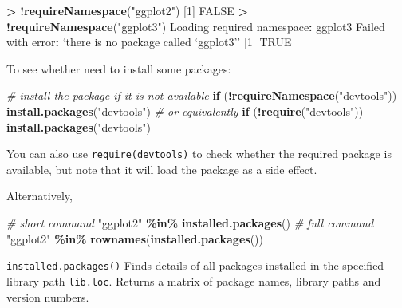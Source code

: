 \documentclass[
  a4paper,
  twoside,
  openright]{book}
\newenvironment{Shaded}{\begin{snugshade}}{\end{snugshade}}
\newcommand{\CommentTok}[1]{\textcolor[rgb]{0.56,0.35,0.01}{\textit{#1}}}
\newcommand{\ConstantTok}[1]{\textcolor[rgb]{0.56,0.35,0.01}{#1}}
\newcommand{\ControlFlowTok}[1]{\textcolor[rgb]{0.13,0.29,0.53}{\textbf{#1}}}
\newcommand{\DecValTok}[1]{\textcolor[rgb]{0.00,0.00,0.81}{#1}}
\newcommand{\FunctionTok}[1]{\textcolor[rgb]{0.13,0.29,0.53}{\textbf{#1}}}
\newcommand{\NormalTok}[1]{#1}
\newcommand{\SpecialCharTok}[1]{\textcolor[rgb]{0.81,0.36,0.00}{\textbf{#1}}}
\newcommand{\StringTok}[1]{\textcolor[rgb]{0.31,0.60,0.02}{#1}}
\theoremstyle{definition}
\theoremstyle{definition}
\theoremstyle{definition}
\theoremstyle{definition}
\theoremstyle{remark}
\begin{document}
\begin{Shaded}
\begin{Highlighting}[]
\SpecialCharTok{\textgreater{}} \SpecialCharTok{!}\FunctionTok{requireNamespace}\NormalTok{(}\StringTok{"ggplot2"}\NormalTok{)}
\NormalTok{[}\DecValTok{1}\NormalTok{] }\ConstantTok{FALSE}
\SpecialCharTok{\textgreater{}} \SpecialCharTok{!}\FunctionTok{requireNamespace}\NormalTok{(}\StringTok{"ggplot3"}\NormalTok{)}
\NormalTok{Loading required namespace}\SpecialCharTok{:}\NormalTok{ ggplot3}
\NormalTok{Failed with error}\SpecialCharTok{:}\NormalTok{  ‘there is no package called ‘ggplot3’’}
\NormalTok{[}\DecValTok{1}\NormalTok{] }\ConstantTok{TRUE}
\end{Highlighting}
\end{Shaded}

To see whether need to install some packages:

\begin{Shaded}
\begin{Highlighting}[]
\CommentTok{\# install the package if it is not available}
\ControlFlowTok{if}\NormalTok{ (}\SpecialCharTok{!}\FunctionTok{requireNamespace}\NormalTok{(}\StringTok{"devtools"}\NormalTok{)) }\FunctionTok{install.packages}\NormalTok{(}\StringTok{"devtools"}\NormalTok{)}
\CommentTok{\# or equivalently}
\ControlFlowTok{if}\NormalTok{ (}\SpecialCharTok{!}\FunctionTok{require}\NormalTok{(}\StringTok{"devtools"}\NormalTok{)) }\FunctionTok{install.packages}\NormalTok{(}\StringTok{"devtools"}\NormalTok{)}
\end{Highlighting}
\end{Shaded}

You can also use \texttt{require(devtools)} to check whether the required package is available, but note that it will load the package as a side effect.

Alternatively,

\begin{Shaded}
\begin{Highlighting}[]
\CommentTok{\# short command}
\StringTok{"ggplot2"} \SpecialCharTok{\%in\%} \FunctionTok{installed.packages}\NormalTok{()}
\CommentTok{\# full command}
\StringTok{"ggplot2"} \SpecialCharTok{\%in\%} \FunctionTok{rownames}\NormalTok{(}\FunctionTok{installed.packages}\NormalTok{())}
\end{Highlighting}
\end{Shaded}

\texttt{installed.packages()} Finds details of all packages installed in the specified library path \texttt{lib.loc}. Returns a matrix of package names, library paths and version numbers.
\end{document}
